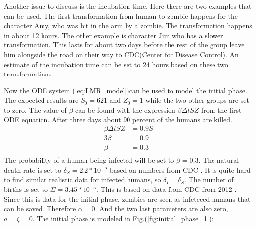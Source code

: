 \documentclass[%
twoside,                 %
final,                   %
10pt]{article}
\begin{document}
\vspace{3mm}




\vspace{3mm}


Another issue to discuss is the incubation time. Here there are two examples that can be used. The first transformation from human to zombie happens for the character Amy, who was bit in the arm by a zombie. The transformation happens in about 12 hours. The other example is character Jim who has a slower transformation. This lasts for about two days before the rest of the group leave him alongside the road on their way to CDC(Center for Disease Control). An estimate of the incubation time can be set to 24 hours based on these two transformations.


\vspace{3mm}




\vspace{3mm}


Now the ODE system (\ref{eq:LMR_model})can be used to model the initial phase. The expected results are $S_0 = 621$ and $Z_0 = 1$ while the two other groups are set to zero. The value of $\beta$ can be found with the expression $\beta \Delta t S Z$ from the first ODE equation. After three days about 90 percent of the humans are killed.
\begin{equation}
	\begin{aligned}
	\beta\Delta t S Z &= 0.9 S\\
	3\beta   &= 0.9 \\
	\beta &= 0.3 \\
	\end{aligned}
\end{equation}
The probability of a human being infected will be set to $\beta = 0.3$. The natural death rate is set to $\delta_S = 2.2*10^{-5}$ based on numbers from CDC \cite{CBC_deaths_2011}. It is quite hard to find similar realistic data for infected humans, so $\delta_I = \delta_S$. The number of births is set to $\Sigma = 3.45*10^{-5}$. This is based on data from CDC from 2012 \cite{CBC_births_2012}. Since this is data for the initial phase, zombies are seen as infeteced humans that can be saved. Therefore $\alpha = 0$. And the two last parameters are also zero, $a = \zeta = 0$. The initial phase is modeled in Fig.(\ref{fig:initial_phase_1}):
\end{document}
